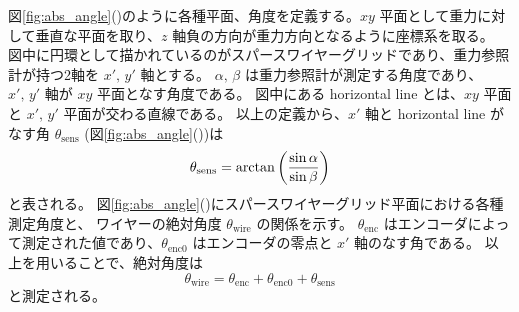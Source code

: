 \documentclass[../../main.tex]{subfiles}
\begin{document}
図\ref{fig:abs_angle}()のように各種平面、角度を定義する。$xy$ 平面として重力に対して垂直な平面を取り、$z$ 軸負の方向が重力方向となるように座標系を取る。
図中に円環として描かれているのがスパースワイヤーグリッドであり、重力参照計が持つ2軸を $x',\,y'$ 軸とする。
$\alpha,\,\beta$ は重力参照計が測定する角度であり、$x',\,y'$ 軸が $xy$ 平面となす角度である。
図中にある horizontal line とは、$xy$ 平面と $x',\,y'$ 平面が交わる直線である。
以上の定義から、$x'$ 軸と horizontal line がなす角 $\theta_{\mathrm{sens}}$ (図\ref{fig:abs_angle}())は
\begin{equation}
    \theta_{\mathrm{sens}} = \arctan\qty(\dfrac{\sin\alpha}{\sin\beta})
    \label{eq:wg_theta_sens}
\end{equation}
と表される\cite{swg:Murata_2023}。
図\ref{fig:abs_angle}()にスパースワイヤーグリッド平面における各種測定角度と、
ワイヤーの絶対角度 $\theta_{\mathrm{wire}}$ の関係を示す。
$\theta_{\mathrm{enc}}$ はエンコーダによって測定された値であり、$\theta_{\mathrm{enc}0}$ はエンコーダの零点と $x'$ 軸のなす角である。
以上を用いることで、絶対角度は
\begin{equation}
    \theta_{\mathrm{wire}} = \theta_{\mathrm{enc}} + \theta_{\mathrm{enc}0} + \theta_{\mathrm{sens}}
\end{equation}
と測定される。
\end{document}
